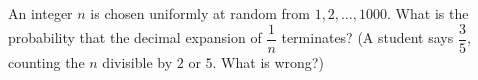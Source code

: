 An integer $n$ is chosen uniformly at random from $1,2,\dots,1000$. What is the probability that the decimal expansion of $\dfrac{1}{n}$ terminates? (A student says $\dfrac{3}{5}$, counting the $n$ divisible by $2$ or $5$. What is wrong?)
